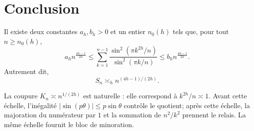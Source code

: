 \documentclass[11pt,a4paper]{article}
\begin{document}
\section{Conclusion}

\begin{resultbox}
Il existe deux constantes $a_h,b_h>0$ et un entier $n_0(h)$ tels que, pour
tout $n\geq n_0(h)$,
\[
\boxed{
a_h n^{\frac{4h-1}{2h}}
\leq
\sum_{k=1}^{n-1}
\frac{\sin^2(\pi k^{2h}/n)}{\sin^2(\pi k/n)}
\leq
b_h n^{\frac{4h-1}{2h}}.}
\]
Autrement dit,
\[
S_n\asymp_h n^{(4h-1)/(2h)}.
\]
\end{resultbox}

\begin{remarkbox}
La coupure $K_n\asymp n^{1/(2h)}$ est naturelle : elle correspond à
$k^{2h}/n\asymp1$. Avant cette échelle, l'inégalité
$|\sin(p\theta)|\leq p\sin\theta$ contrôle le quotient; après cette échelle,
la majoration du numérateur par $1$ et la sommation de $n^2/k^2$ prennent le
relais. La même échelle fournit le bloc de minoration.
\end{remarkbox}
\end{document}
